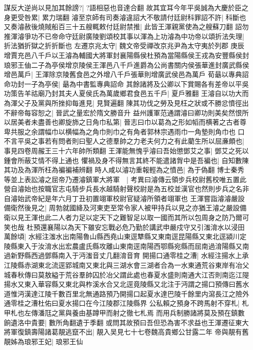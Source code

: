 謀反大逆尚以見加其餘謗?|{
	?語相惡也音達合翻}
故其宜耳今年平吳誠為大慶於臣之身更受咎累|{
	累力瑞翻}
濬至京師有司奏濬違詔大不敬請付廷尉科罪詔不許|{
	科斷也}
又奏濬赦後燒賊船百三十五艘輒敕付廷尉禁推|{
	此皆王渾親黨使為之艘蘇刀翻}
詔勿推渾濬爭功不已帝命守廷尉廣陵劉頌校其事以渾為上功濬為中功帝以頌折法失理|{
	折法猶折獄之折折斷也}
左遷京兆太守|{
	魏文帝受禪改京兆尹為太守夷於列郡}
庚辰增賈充邑八千戶以王濬為輔國大將軍封襄陽縣侯杜預為當陽縣侯王戎為安豐縣侯封琅邪王伷二子為亭侯增京陵侯王渾邑八千戶進爵為公尚書關内侯張華進封廣武縣侯增邑萬戶|{
	王渾除京陵舊食邑之外增八千戶張華則增廣武侯邑為萬戶}
荀朂以專典詔命功封一子為亭侯|{
	朂為中書監專典詔命}
其餘諸將及公卿以下賞賜各有差帝以平吳功策告羊祜廟乃封其夫人夏侯氏為萬歲鄉君食邑五千戶|{
	夏戶雅翻}
王濬自以功大而為渾父子及黨與所挫抑每進見|{
	見賢遍翻}
陳其功伐之勞及見枉之狀或不勝忿憤徑出不辭帝每容恕之|{
	晉武之量宏於隋文勝音升}
益州護軍范通謂濬曰卿功則美矣然恨所以居美者未盡善也卿旋斾之日角巾私第|{
	晉志曰巾以葛為之形如幍而横著之古者尊卑共服之余謂幅巾以横幅為之角巾則巾之有角者郭林宗遇雨巾一角墊則角巾也}
口不言平吳之事若有問者則曰聖人之德羣帥之力老夫何力之有此藺生所以屈亷頗也|{
	事見四卷周赧王三十六年帥所類翻}
王渾能無愧乎濬曰吾始懲鄧艾之事|{
	鄧艾之死以鍾會所蔽艾情不得上通也}
懼禍及身不得無言其終不能遣諸胷中是吾褊也|{
	自知數陳其功及為渾所枉為褊褊補辨翻}
時人咸以濬功重報輕為之憤邑|{
	為于偽翻}
博士秦秀等並上表訟濬之屈帝乃遷濬鎮軍大將軍　|{
	考異曰濬傳云領步兵校尉舊校唯五置此營自濬始也按職官志屯騎步兵長水越騎射聲校尉是為五校並漢官也然則步兵之名非自濬始武帝紀是年六月丁丑初置翊軍校尉官疑濬所領者翊軍也}
王渾嘗詣濬濬嚴設備衛然後見之|{
	周勃就國絳及河東吏至常令家人被甲持兵以見之亦猶王濬之嚴設備衛以見王渾也此二人者力足以定天下之難智足以取一國而其所以包周身之防乃爾可笑也哉}
杜預還襄陽以為天下雖安忘戰必危乃勤於講武申嚴戍守又引滍淯水以浸田萬餘頃|{
	水經注滍水出南陽魯山縣西堯山東逕犨縣又東南逕昆陽縣又東北逕潁川定陵縣東入于汝淯水出宏農盧氏縣攻離山東南逕南陽西鄂縣宛縣而屈南過淯陽縣又南過新野縣西過鄧縣南入于沔滍音丈几翻淯音育}
開揚口通零桂之漕|{
	水經注揚水上承江陵縣赤湖東北流逕郢城南又東北與三湖水會三湖者合為一水東通荒谷東岸有冶父城春秋傳曰莫敖縊于荒谷羣帥囚於冶父謂此處也春夏水盛則南通大江否則南迄江隄揚水又東入華容縣又東北與柞溪水合又北逕竟陵縣又北注于沔謂之揚口預傳曰舊水道惟沔漢達江陵千數百里北無通路預乃開揚口起夏水達巴陵千餘里内瀉長江之險外通零桂之漕杜佑曰夏水揚口在今江陵郡江陵縣界}
公私賴之預身不跨馬射不穿札|{
	札甲札也左傳潘尫之黨與養由基蹲甲而射之徹七札焉}
而用兵制勝諸將莫及預在鎮數餉遺洛中貴要|{
	數所角翻遺于季翻}
或問其故預曰吾但恐為害不求益也王渾遷征東大將軍復鎮壽陽諸葛靚逃竄不出|{
	靚入吴見七十七卷魏高貴鄉公甘露二年}
帝與靚有舊靚姊為琅邪王妃|{
	琅邪王仙}
